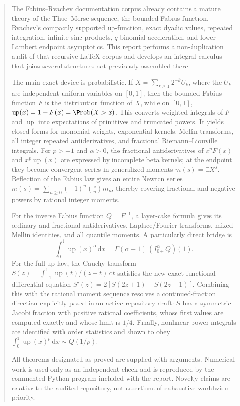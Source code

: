 \documentclass[11pt,oneside]{article}
\theoremstyle{definition}
\theoremstyle{remark}
\newcommand{\Up}{\operatorname{up}}
\newcommand{\E}{\mathbb E}
\newcommand{\dd}{\,\mathrm d}
\newcommand{\1}{\mathbf 1}
\begin{document}
\begin{abstract}
The Fabius--Rvachev documentation corpus already contains a mature theory of the
Thue--Morse sequence, the bounded Fabius function, Rvachev's compactly supported
up-function, exact dyadic values, repeated integration, infinite sinc products,
$q$-binomial acceleration, and lower-Lambert endpoint asymptotics.  This report
performs a non-duplication audit of that recursive LaTeX corpus and develops an
integral calculus that joins several structures not previously assembled there.

The main exact device is probabilistic.  If
\(X=\sum_{k\ge1}2^{-k}U_k\), where the \(U_k\) are independent uniform
variables on \([0,1]\), then the bounded Fabius function \(F\) is the distribution
function of \(X\), while on \([0,1]\),
\(\Up(x)=1-F(x)=\Prob(X>x)\).  This converts weighted integrals of \(F\)
and \(\Up\) into expectations of primitives and truncated powers.  It yields
closed forms for monomial weights, exponential kernels, Mellin transforms, all
integer repeated antiderivatives, and fractional Riemann--Liouville integrals.
For \(p>-1\) and \(\alpha>0\), the fractional antiderivatives of
\(x^pF(x)\) and \(x^p\Up(x)\) are expressed by incomplete beta kernels; at
the endpoint they become convergent series in generalized moments
\(m(s)=\E X^s\).  Reflection of the Fabius law gives an entire Newton series
\(m(s)=\sum_{n\ge0}(-1)^n\binom{s}{n}m_n\), thereby covering fractional and
negative powers by rational integer moments.

For the inverse Fabius function \(Q=F^{-1}\), a layer-cake formula gives its
ordinary and fractional antiderivatives, Laplace/Fourier transforms, mixed
Mellin identities, and all quantile moments.  A particularly direct bridge is
\[
 \int_0^1\Up(x)^\alpha\dd x
 =\Gamma(\alpha+1)\,(I_{0+}^{\alpha}Q)(1).
\]
For the full up-law, the Cauchy transform
\(S(z)=\int_{-1}^1\Up(t)/(z-t)\dd t\) satisfies the new exact
functional-differential equation
\(S'(z)=2[S(2z+1)-S(2z-1)]\).  Combining this with the rational moment
sequence resolves a continued-fraction direction explicitly posed in an active
repository draft: \(S\) has a symmetric Jacobi fraction with positive rational
coefficients, whose first values are computed exactly and whose limit is
\(1/4\).  Finally, nonlinear power integrals are identified with order
statistics and shown to obey
\(\int_0^1\Up(x)^p\dd x\sim Q(1/p)\).

All theorems designated as proved are supplied with arguments.  Numerical work
is used only as an independent check and is reproduced by the commented Python
program included with the report.  Novelty claims are relative to the audited
repository, not assertions of exhaustive worldwide priority.
\end{abstract}
\end{document}
